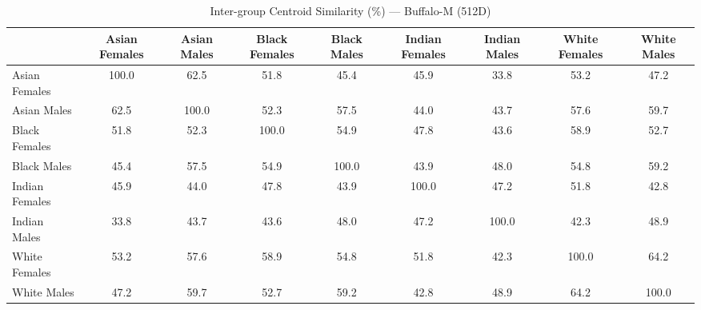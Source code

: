 \begin{table}[htbp]
\centering
\caption{Inter-group Centroid Similarity (\%) — Buffalo-M (512D)}
\label{tab:inter-if-buffalo-m}
\tiny
\begin{tabular}{lcccccccc}
\toprule
 & Asian Females & Asian Males & Black Females & Black Males & Indian Females & Indian Males & White Females & White Males \\
\midrule
Asian Females & 100.0 & 62.5 & 51.8 & 45.4 & 45.9 & 33.8 & 53.2 & 47.2 \\
Asian Males & 62.5 & 100.0 & 52.3 & 57.5 & 44.0 & 43.7 & 57.6 & 59.7 \\
Black Females & 51.8 & 52.3 & 100.0 & 54.9 & 47.8 & 43.6 & 58.9 & 52.7 \\
Black Males & 45.4 & 57.5 & 54.9 & 100.0 & 43.9 & 48.0 & 54.8 & 59.2 \\
Indian Females & 45.9 & 44.0 & 47.8 & 43.9 & 100.0 & 47.2 & 51.8 & 42.8 \\
Indian Males & 33.8 & 43.7 & 43.6 & 48.0 & 47.2 & 100.0 & 42.3 & 48.9 \\
White Females & 53.2 & 57.6 & 58.9 & 54.8 & 51.8 & 42.3 & 100.0 & 64.2 \\
White Males & 47.2 & 59.7 & 52.7 & 59.2 & 42.8 & 48.9 & 64.2 & 100.0 \\
\bottomrule
\end{tabular}
\end{table}
